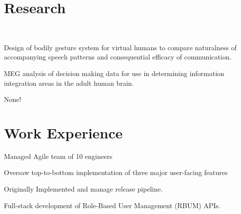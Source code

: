 \documentclass[]{csaund_resume-openfont}
\begin{document}
\begin{minipage}[t]{0.66\textwidth}



\section{Research}
 \\
\vspace{\topsep} %
\begin{tightemize}
\item Design of bodily gesture system for virtual humans to compare naturalness of accompanying speech patterns and consequential efficacy of communication.
\item MEG analysis of decision making data for use in determining information integration areas in the adult human brain.
\end{tightemize}
\sectionsep
{}
\begin{tightemize}
\item None! 
\end{tightemize}
\sectionsep


\section{Work Experience}

\begin{tightemize}
\item Managed Agile team of 10 engineers 
\item Oversaw top-to-bottom implementation of three major user-facing features
\end{tightemize}

\begin{tightemize}
\item Originally Implemented and manage release pipeline.
\item Full-stack development of Role-Based User Management (RBUM) APIs.
\end{tightemize}
\sectionsep


\end{minipage}
\end{document}
